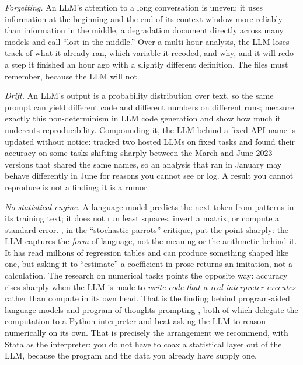 \documentclass[
    a4paper,
    fontsize=10pt,
    twoside=true,
    numbers=noenddot,
]{kaobook}
\begin{document}
\emph{Forgetting.} An LLM's attention to a long conversation is uneven: it uses information at the beginning and the end of its context window more reliably than information in the middle, a degradation \textcite{liu2024lost} document directly across many models and call \enquote{lost in the middle.} Over a multi-hour analysis, the LLM loses track of what it already ran, which variable it recoded, and why, and it will redo a step it finished an hour ago with a slightly different definition. The files must remember, because the LLM will not.

\emph{Drift.} An LLM's output is a probability distribution over text, so the same prompt can yield different code and different numbers on different runs; \textcite{ouyang2025nondeterminism} measure exactly this non-determinism in LLM code generation and show how much it undercuts reproducibility. Compounding it, the LLM behind a fixed API name is updated without notice: \textcite{chen2023drift} tracked two hosted LLMs on fixed tasks and found their accuracy on some tasks shifting sharply between the March and June 2023 versions that shared the same names, so an analysis that ran in January may behave differently in June for reasons you cannot see or log. A result you cannot reproduce is not a finding; it is a rumor.

\emph{No statistical engine.} A language model predicts the next token from patterns in its training text; it does not run least squares, invert a matrix, or compute a standard error. \textcite{bender2021parrots}, in the \enquote{stochastic parrots} critique, put the point sharply: the LLM captures the \emph{form} of language, not the meaning or the arithmetic behind it. It has read millions of regression tables and can produce something shaped like one, but asking it to \enquote{estimate} a coefficient in prose returns an imitation, not a calculation. The research on numerical tasks points the opposite way: accuracy rises sharply when the LLM is made to \emph{write code that a real interpreter executes} rather than compute in its own head. That is the finding behind program-aided language models \parencite{gao2023pal} and program-of-thoughts prompting \parencite{chen2023pot}, both of which delegate the computation to a Python interpreter and beat asking the LLM to reason numerically on its own. That is precisely the arrangement we recommend, with Stata as the interpreter: you do not have to coax a statistical layer out of the LLM, because the program and the data you already have supply one.
\end{document}
